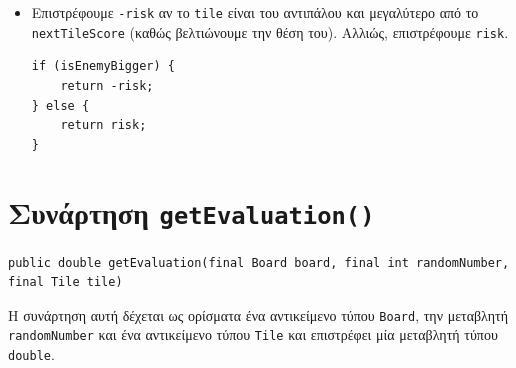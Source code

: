\begin{itemize}
\item Επιστρέφουμε \lstinline!-risk! αν το \lstinline!tile! είναι του αντιπάλου και μεγαλύτερο από το
\lstinline!nextTileScore! (καθώς βελτιώνουμε την θέση του).
Αλλιώς, επιστρέφουμε \lstinline!risk!.
\begin{lstlisting}[numbers=none, aboveskip=\smallskipamount, belowskip=\smallskipamount, captionpos=none]
if (isEnemyBigger) {
    return -risk;
} else {
    return risk;
}
\end{lstlisting}
\end{itemize}

\section{Συνάρτηση \texttt{getEvaluation()}}
\begin{lstlisting}[numbers=none, title={Declaration της συνάρτησης}]
public double getEvaluation(final Board board, final int randomNumber, final Tile tile)
\end{lstlisting}
Η συνάρτηση αυτή δέχεται ως ορίσματα ένα αντικείμενο τύπου \lstinline!Board!, την μεταβλητή
\lstinline!randomNumber! και ένα αντικείμενο τύπου \lstinline!Tile! και επιστρέφει
μία μεταβλητή τύπου \lstinline!double!.


